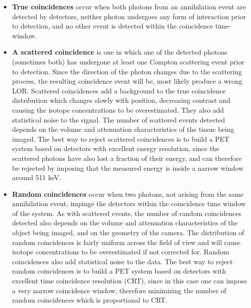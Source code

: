 \begin{itemize}
\item {\bf True coincidences} occur when both photons from an annihilation event are detected by detectors, neither photon undergoes any form of interaction prior to detection, and no other event is detected within the coincidence time-window.
\item {\bf A scattered coincidence} is one in which one of the detected photons (sometimes both) has undergone at least one Compton scattering event prior to detection. Since the direction of the photon changes due to the scattering process, the resulting coincidence event will be, most likely produce a wrong LOR. Scattered coincidences add a background to the true coincidence distribution which changes slowly with position, decreasing contrast and causing the isotope concentrations to be overestimated. They also add statistical noise to the signal. The number of scattered events detected depends on the volume and attenuation characteristics of the tissue being imaged. The best way to reject scattered coincidences is to build a PET system based on detectors with excellent energy resolution, since the scattered photons have also lost a fraction of their energy, and can therefore be rejected by imposing that the measured energy is inside a narrow window around 511 keV.
\item {\bf Random coincidences} occur when two photons, not arising from the same annihilation event, impinge the detectors within the coincidence time window of the system. As with scattered events, the number of random coincidences detected also depends on the volume and attenuation characteristics of the object being imaged, and on the geometry of the camera. The distribution of random coincidences is fairly uniform across the field of view and will cause isotope concentrations to be overestimated if not corrected for. Random coincidences also add statistical noise to the data. The best way to reject random coincidences is to build a PET system based on detectors with excellent time coincidence resolution (CRT), since in this case one can impose a very narrow coincidence window, therefore minimizing the number of random coincidences which is proportional to CRT. 
\end{itemize}


